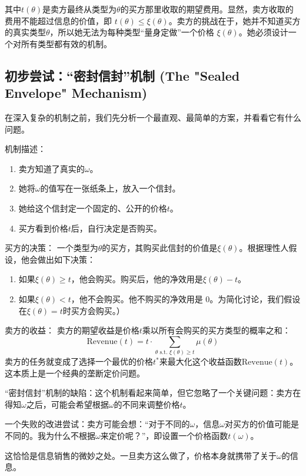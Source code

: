 其中$t(\theta)$是卖方最终从类型为$\theta$的买方那里收取的期望费用。显然，卖方收取的费用不能超过信息的价值，即
$t(\theta)\leq\xi(\theta)$。卖方的挑战在于，她并不知道买方的真实类型$\theta$，所以她无法为每种类型“量身定做”一个价格
$\xi(\theta)$。她必须设计一个对所有类型都有效的机制。
  
\subsection{初步尝试：“密封信封”机制 (The "Sealed Envelope" Mechanism)}

在深入复杂的机制之前，我们先分析一个最直观、最简单的方案，并看看它有什么问题。

机制描述：
\begin{enumerate}
    \item 卖方知道了真实的$\omega$。
    \item 她将$\omega$的值写在一张纸条上，放入一个信封。
    \item 她给这个信封定一个固定的、公开的价格$t$。
    \item 买方看到价格$t$后，自行决定是否购买。
\end{enumerate}

买方的决策：
一个类型为$\theta$的买方，其购买此信封的价值是$\xi(\theta)$。根据理性人假设，他会做出如下决策：
\begin{enumerate}
    \item 如果$\xi(\theta)\geq t$，他会购买。购买后，他的净效用是$\xi(\theta)-t$。
    \item 如果$\xi(\theta)<t$，他不会购买。他不购买的净效用是 0。为简化讨论，我们假设在$\xi(\theta)=t$时买方会购买。）
\end{enumerate}

卖方的收益：
卖方的期望收益是价格$t$乘以所有会购买的买方类型的概率之和：
$$\text{Revenue}(t) = t\cdot \sum\limits_{\theta \text{ s.t. }\xi(\theta)\geq t}\mu(\theta)$$
卖方的任务就变成了选择一个最优的价格$t^\ast$来最大化这个收益函数$\text{Revenue}(t)$。这本质上是一个经典的垄断定价问题。

“密封信封”机制的缺陷：这个机制看起来简单，但它忽略了一个关键问题：卖方在得知$\omega$之后，可能会希望根据$\omega$的不同来调整价格$t$。

一个失败的改进尝试：卖方可能会想：“对于不同的$\omega$，信息$\omega$对买方的价值可能是不同的。我为什么不根据$\omega$来定价呢？”，即设置一个价格函数$t(\omega)$。

这恰恰是信息销售的微妙之处。一旦卖方这么做了，价格本身就携带了关于$\omega$的信息。

